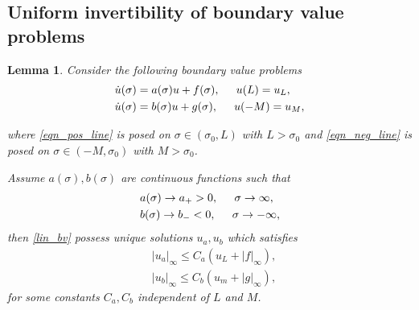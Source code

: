 \documentclass[letterpaper,11pt]{article}
\numberwithin{equation}{section}
\theoremstyle{plain}
\newtheorem{Lemma}{Lemma}[section]
\begin{document}
\subsection{Uniform invertibility of boundary value problems }
\begin{Lemma}\label{pert_inv}
Consider the following boundary value problems 
\begin{subequations}
\label{lin_bv}
\begin{align}
       &\dot{u}(\sigma) = a(\sigma) u + f(\sigma), \hspace{0.2in} u(L)= u_L,         \label{eqn_pos_line}  \\
              &\dot{u}(\sigma) = b(\sigma) u + g(\sigma), \hspace{0.2in} u(-M)= u_M,         \label{eqn_neg_line}
\end{align}
\end{subequations}

where \eqref{eqn_pos_line} is posed on $\sigma \in (\sigma_0,L)$ with $L>\sigma_0$ and \eqref{eqn_neg_line} is posed on $\sigma \in (-M,\sigma_0)$ with $M>\sigma_0$. 

Assume $a(\sigma), b(\sigma)$ are continuous functions such that 
\begin{subequations}
\label{ode_asy}
\begin{align}
       &a(\sigma) \to a_+>0, \hspace{0.2in} \sigma \to \infty      ,  \label{ode_asy_a}  \\
       &b(\sigma) \to b_- < 0, \hspace{0.2in} \sigma \to -\infty,         \label{ode_asy_b}
\end{align}
\end{subequations}
then \eqref{lin_bv} possess unique solutions $u_a,u_b$ which satisfies
\begin{subequations}
\label{ode_est}
\begin{align}
       &|u_a|_\infty \le C_a(u_L+|f|_\infty),  \label{ode_est_a}  \\
       &|u_b|_\infty \le C_b(u_m+|g|_\infty),         \label{ode_est_b}
\end{align}
\end{subequations}
for some constants $C_a, C_b$ independent of $L$ and $M$.
\end{Lemma}
\end{document}
